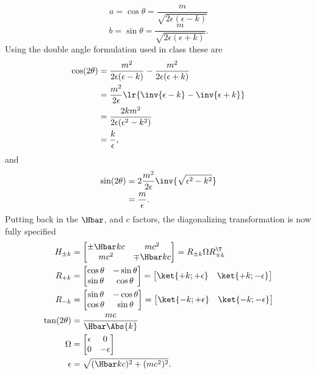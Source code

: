 %
\begin{equation}\label{eqn:gradQuantumProblemSet4Problem3:440}
a = \cos\theta
=
\frac{m}{\sqrt{2\epsilon(\epsilon - k)}}
\end{equation}
%
\begin{equation}\label{eqn:gradQuantumProblemSet4Problem3:460}
b = \sin\theta
=
\frac{m}{\sqrt{2\epsilon(\epsilon + k)}}.
\end{equation}
%
Using the double angle formulation used in class these are
%
\begin{equation}\label{eqn:gradQuantumProblemSet4Problem3:480}
\begin{aligned}
\cos(2 \theta)
&=
\frac{m^2}{2\epsilon(\epsilon - k)} -
\frac{m^2}{2\epsilon(\epsilon + k)}
\\ &=
\frac{m^2}{2 \epsilon} \lr{ \inv{\epsilon - k} - \inv{\epsilon + k} }
\\ &=
\frac{2 k m^2}{2 \epsilon (\epsilon^2 - k^2)}
\\ &=
\frac{k}{\epsilon},
\end{aligned}
\end{equation}
%
and
\begin{equation}\label{eqn:gradQuantumProblemSet4Problem3:500}
\begin{aligned}
\sin(2 \theta)
&=
2 \frac{m^2}{2 \epsilon} \inv{\sqrt{\epsilon^2 - k^2}}
\\ &=
\frac{m}{\epsilon}.
\end{aligned}
\end{equation}
%
Putting back in the \( \Hbar \), and \( c\) factors, the diagonalizing transformation is now fully specified
%
\begin{equation}\label{eqn:gradQuantumProblemSet4Problem3:520}
\begin{aligned}
H_{\pm k} &=
\begin{bmatrix}
\pm \Hbar k c & m c^2 \\
m c^2 & \mp \Hbar k c
\end{bmatrix}
=
R_{\pm k} \Omega R_{\pm k}^\T \\
R_{+ k} &=
\begin{bmatrix}
\cos\theta & -\sin\theta  \\
\sin\theta & \cos\theta
\end{bmatrix}
=
\begin{bmatrix}
\ket{+k;+\epsilon} &
\ket{+k;-\epsilon}
\end{bmatrix}
\\
R_{- k} &=
\begin{bmatrix}
\sin\theta & -\cos\theta  \\
\cos\theta & \sin\theta
\end{bmatrix}
=
\begin{bmatrix}
\ket{-k;+\epsilon} &
\ket{-k;-\epsilon}
\end{bmatrix}
\\
\tan(2 \theta) &= \frac{m c}{\Hbar \Abs{k}} \\
\Omega &=
\begin{bmatrix}
\epsilon & 0 \\
0 & -\epsilon
\end{bmatrix} \\
\epsilon &= \sqrt{(\Hbar k c)^2 + (m c^2)^2}.
\end{aligned}
\end{equation}
